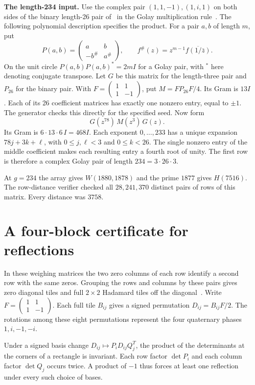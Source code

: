 \documentclass[10pt]{article}
\begin{document}
\medskip\noindent\textbf{The length-234 input.}
Use the complex pair $(1,1,-1),(1,i,1)$ on both sides of the binary length-26 pair of~\cite{seeds} in the Golay multiplication rule~\cite{complex}. The following polynomial description specifies the product. For a pair $a,b$ of length $m$, put
\[
 P(a,b)=\begin{pmatrix}a& b\\-b^\#&a^\#\end{pmatrix},
 \qquad f^\#(z)=z^{m-1}\overline{f(1/\bar z)} .
\]
On the unit circle $P(a,b)P(a,b)^*=2mI$ for a Golay pair, with $^*$ here denoting conjugate transpose. Let $G$ be this matrix for the length-three pair and $P_{26}$ for the binary pair. With $F=\left(\begin{smallmatrix}1&1\\1&-1\end{smallmatrix}\right)$, put $M=FP_{26}F/4$. Its Gram is $13I$. Each of its 26 coefficient matrices has exactly one nonzero entry, equal to $\pm1$. The generator checks this directly for the specified seed. Now form
\[
 G(z^{78})\,M(z^3)\,G(z).
\]
Its Gram is $6\cdot13\cdot6\,I=468I$. Each exponent $0,\ldots,233$ has a unique expansion $78j+3k+\ell$, with $0\le j,\ell<3$ and $0\le k<26$. The single nonzero entry of the middle coefficient makes each resulting entry a fourth root of unity. The first row is therefore a complex Golay pair of length $234=3\cdot26\cdot3$.

At $g=234$ the array gives $W(1880,1878)$ and the prime $1877$ gives $H(7516)$. The row-distance verifier checked all $28{,}241{,}370$ distinct pairs of rows of this matrix. Every distance was $3758$.

\newpage
\section*{A four-block certificate for reflections}
In these weighing matrices the two zero columns of each row identify a second row with the same zeros. Grouping the rows and columns by these pairs gives zero diagonal tiles and full $2\times2$ Hadamard tiles off the diagonal~\cite{kline}. Write $F=\left(\begin{smallmatrix}1&1\\1&-1\end{smallmatrix}\right)$. Each full tile $B_{ij}$ gives a signed permutation $D_{ij}=B_{ij}F/2$. The rotations among these eight permutations represent the four quaternary phases $1,i,-1,-i$.

Under a signed basis change $D_{ij}\mapsto P_i D_{ij}Q_j^{T}$, the product of the determinants at the corners of a rectangle is invariant. Each row factor $\det P_i$ and each column factor $\det Q_j$ occurs twice. A product of $-1$ thus forces at least one reflection under every such choice of bases.
\end{document}
